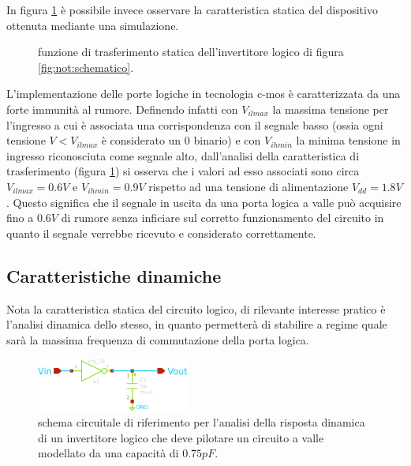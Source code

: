 	In figura \ref{fig:not:carattstatica} è possibile invece osservare la caratteristica statica del dispositivo ottenuta mediante una simulazione.
	
	\begin{figure}[H]
		\centering
		
		\caption{funzione di trasferimento statica dell'invertitore logico di figura \ref{fig:not:schematico}.}
		\label{fig:not:carattstatica}
	\end{figure}

	L'implementazione delle porte logiche in tecnologia c-mos è caratterizzata da una forte immunità al rumore. Definendo infatti con $V_{ilmax}$ la massima tensione per l'ingresso a cui è associata una corrispondenza con il segnale basso (ossia ogni tensione $V<V_{ilmax}$ è considerato un 0 binario) e con $V_{ihmin}$ la minima tensione in ingresso riconosciuta come segnale alto, dall'analisi della caratteristica di trasferimento (figura \ref{fig:not:carattstatica}) si osserva che i valori ad esso associati sono circa $V_{ilmax} =0.6V$ e $V_{ihmin} = 0.9V$ rispetto ad una tensione di alimentazione $V_{dd} = 1.8V$. Questo significa che il segnale in uscita da una porta logica a valle può acquisire fino a $0.6V$ di rumore senza inficiare sul corretto funzionamento del circuito in quanto il segnale verrebbe ricevuto e considerato correttamente.
	
	\subsection*{Caratteristiche dinamiche}
		
		Nota la caratteristica statica del circuito logico, di rilevante interesse pratico è l'analisi dinamica dello stesso, in quanto permetterà di stabilire a regime quale sarà la massima frequenza di commutazione della porta logica.
		
		\begin{figure}[bht]
			\centering
			\includegraphics[width=5cm]{Immagini/not-gate-carico}
			\caption{schema circuitale di riferimento per l'analisi della risposta dinamica di un invertitore logico che deve pilotare un circuito a valle modellato da una capacità di $0.75pF$.}
			\label{fig:not:dinamica-schema}
		\end{figure}
		
